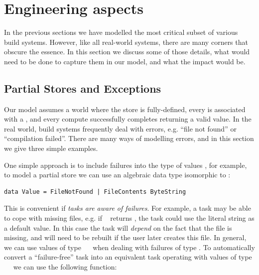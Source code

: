 \section{Engineering aspects}\label{sec-engineering}

In the previous sections we have modelled the most critical subset of various
build systems. However, like all real-world systems, there are many corners that
obscure the essence. In this section we discuss some of those details, what
would need to be done to capture them in our model, and what the impact would be.

\subsection{Partial Stores and Exceptions}\label{sec-failures}

Our model assumes a world where the store is fully-defined, every  is
associated with a , and every compute successfully completes returning a
valid value. In the real world, build systems frequently deal with errors, e.g.
``file not found'' or ``compilation failed''. There are many ways of modelling
errors, and in this section we give three simple examples.


One simple approach is to include failures into the type of values , for
example, to model a partial store we can use an algebraic data type isomorphic
to :

\vspace{1mm}
\begin{verbatim}
data Value = FileNotFound | FileContents ByteString
\end{verbatim}
\vspace{1mm}

\noindent
This is convenient if \emph{tasks are aware of failures}. For example, a task
may be able to cope with missing files, e.g. if ~
returns , the task could use the literal string  as
a default value. In this case the task will \emph{depend} on the fact that the
file  is missing, and will need to be rebuilt if the user
later creates this file. In general, we can use values of type
~~ when dealing with failures of type . To
automatically convert a ``failure-free'' task into an equivalent task operating
with values of type ~~ we can use the following function:

